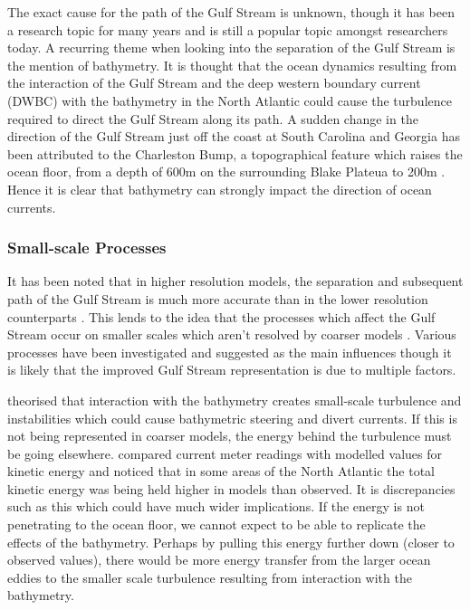 \documentclass[a4paper,11pt]{article}
\begin{document}
The exact cause for the path of the Gulf Stream is unknown, though it has been a research topic for many years and is still a popular topic amongst researchers today. A recurring theme when looking into the separation of the Gulf Stream is the mention of bathymetry. It is thought \citep{Gula2014}\citep{NaveiraGarabato2013}\citep{Nikurashin2012a} that the ocean dynamics resulting from the interaction of the Gulf Stream and the deep western boundary current (DWBC) with the bathymetry in the North Atlantic could cause the turbulence required to direct the Gulf Stream along its path. A sudden change in the direction of the Gulf Stream just off the coast at South Carolina and Georgia has been attributed to the Charleston Bump, a topographical feature which raises the ocean floor, from a depth of 600m on the surrounding Blake Plateua to 200m \citep{Gula2014}. Hence it is clear that bathymetry can strongly impact the direction of ocean currents.


\subsubsection{Small-scale Processes}

It has been noted that in higher resolution models, the separation and subsequent path of the Gulf Stream is much more accurate than in the lower resolution counterparts \citep{Hurlburt2008}\citep{Zhang2007}. This lends to the idea that the processes which affect the Gulf Stream occur on smaller scales which aren't resolved by coarser models \citep{NaveiraGarabato2013}\citep{Nikurashin2012a}. Various processes have been investigated and suggested as the main influences though it is likely that the improved Gulf Stream representation is due to multiple factors.


\citep{NaveiraGarabato2013} theorised that interaction with the bathymetry creates small-scale turbulence and instabilities which could cause bathymetric steering and divert currents. If this is not being represented in coarser models, the energy behind the turbulence must be going elsewhere. \citep{Scott2010} compared current meter readings with modelled values for kinetic energy and noticed that in some areas of the North Atlantic the total kinetic energy was being held higher in models than observed. It is discrepancies such as this which could have much wider implications. If the energy is not penetrating to the ocean floor, we cannot expect to be able to replicate the effects of the bathymetry. Perhaps by pulling this energy further down (closer to observed values), there would be more energy transfer from the larger ocean eddies to the smaller scale turbulence resulting from interaction with the bathymetry.
\end{document}
